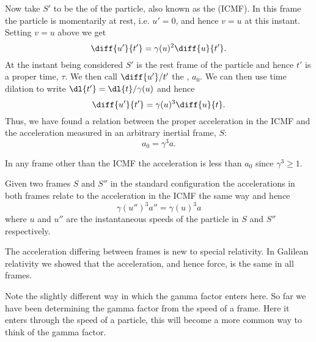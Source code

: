 \documentclass[fleqn]{NotesClass}
\newcommand{\ICMF}{\textsc{ICMF}}
\begin{document}
    Now take \(S'\) to be the  of the particle, also known as the  (\ICMF).
    In this frame the particle is momentarily at rest, i.e. \(u' = 0\), and hence \(v = u\) at this instant.
    Setting \(v = u\) above we get
    \begin{equation}
        \diff{u'}{t'} = \gamma(u)^2 \diff{u}{t'}.
    \end{equation}
    At the instant being considered \(S'\) is the rest frame of the particle and hence \(t'\) is a proper time, \(\tau\).
    We then call \(\diff{u'}/{t'}\) the , \(a_0\).
    We can then use time dilation to write \(\dl{t'} = \dl{t}/\gamma(u)\) and hence
    \begin{equation}
        \diff{u'}{t'} = \gamma(u)^3\diff{u}{t}.
    \end{equation}
    Thus, we have found a relation between the proper acceleration in the \ICMF{} and the acceleration measured in an arbitrary inertial frame, \(S\):
    \begin{equation}
        a_0 = \gamma^3 a.
    \end{equation}
    
    In any frame other than the \ICMF{} the acceleration is less than \(a_0\) since \(\gamma^3 \ge 1\).
    
    Given two frames \(S\) and \(S''\) in the standard configuration the accelerations in both frames relate to the acceleration in the \ICMF{} the same way and hence
    \begin{equation}
        \gamma(u'')^3a'' = \gamma(u)^3a
    \end{equation}
    where \(u\) and \(u''\) are the instantaneous speeds of the particle in \(S\) and \(S''\) respectively.
    
    The acceleration differing between frames is new to special relativity.
    In Galilean relativity we showed that the acceleration, and hence force, is the same in all frames.
    
    Note the slightly different way in which the gamma factor enters here.
    So far we have been determining the gamma factor from the speed of a frame.
    Here it enters through the speed of a particle, this will become a more common way to think of the gamma factor.
    
\end{document}
